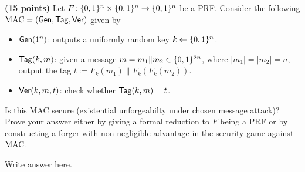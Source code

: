 \documentclass[12pt]{hw}
\begin{document}


\begin{exercise}
  \textbf{(15 points)}
  Let $F\colon \{0,1\}^n \times \{0,1\}^n \rightarrow \{0,1\}^n$ be a PRF. 
  Consider the following\\ $\text{MAC}=(\mathsf{Gen},\mathsf{Tag},\mathsf{Ver})$ given by
  \begin{itemize}
    \item $\mathsf{Gen}(1^n)$: outputs a uniformly random key $k\gets\{0,1\}^n$.
    \item $\mathsf{Tag}(k,m)$: given a message $m=m_1\|m_2\in\{0,1\}^{2n}$, 
      where $|m_1|=|m_2|=n$, output the tag $t:=F_k(m_1)\| F_k(F_k(m_2))$.
    \item $\mathsf{Ver}(k,m,t)$: check whether $\mathsf{Tag}(k,m)=t$.
  \end{itemize}
  Is this MAC secure (existential unforgeabilty under chosen message attack)? Prove your answer either by giving a formal reduction
  to $F$ being a PRF or by constructing a forger with non-negligible advantage
  in the security game against $\text{MAC}$. 
\end{exercise}

\begin{answer} 
Write answer here.
\end{answer}
\end{document}
